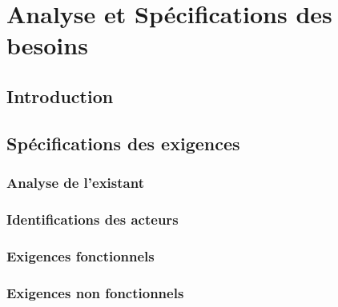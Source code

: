 

\chapter{Analyse et Spécifications des besoins}
\pagestyle{chapterstyle}


\newpage
\vspace{1cm}
\section{Introduction}

\section{Spécifications des exigences}

\subsection{Analyse de l'existant}

\subsection{Identifications des acteurs }

\subsection{Exigences fonctionnels}

\subsection{Exigences non fonctionnels}

